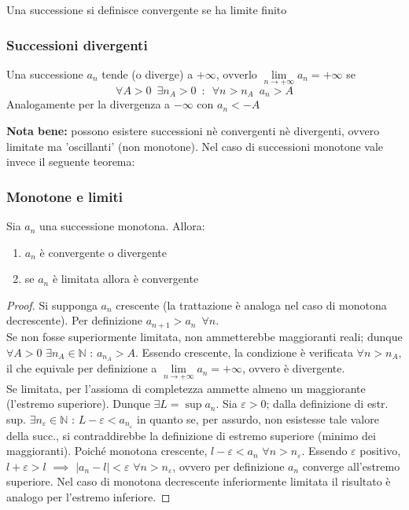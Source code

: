 \documentclass[10pt]{article}
\theoremstyle{plain}
\begin{document}
\begin{defin}
    Una successione si definisce convergente se ha limite finito
\end{defin}

\subsubsection{Successioni divergenti}
\begin{defin}
    Una successione $a_n$ tende (o diverge) a $+\infty$, ovverlo $\lim \limits_{n \rightarrow +\infty} a_n = + \infty$ se 
    \[\forall A > 0 \enspace \exists n_A > 0 \enspace : \enspace \forall n> n_A \enspace a_n > A\]
    Analogamente per la divergenza a $-\infty$ con $a_n < -A$
\end{defin}
\textbf{Nota bene: } possono esistere successioni nè convergenti nè divergenti, ovvero limitate ma 'oscillanti' (non monotone). Nel caso di successioni monotone vale invece il seguente teorema:

\subsubsection{Monotone e limiti}
\begin{ther}
    Sia $a_n$ una successione monotona. Allora:
    \begin{enumerate}
        \item $a_n$ è convergente o divergente
        \item se $a_n$ è limitata allora è convergente
    \end{enumerate}
\end{ther}
\begin{proof}
    Si supponga $a_n$ crescente (la trattazione è analoga nel caso di monotona decrescente). Per definizione $a_{n+1} > a_n \enspace \forall n$. 
    \\Se non fosse superiormente limitata, non ammetterebbe maggioranti reali; dunque $\forall A > 0$ $\exists n_A \in \mathbb{N}$ : $a_{n_A} > A$. Essendo crescente, la condizione è verificata $\forall n > n_A$, il che equivale per definizione a $\lim \limits_{n \rightarrow +\infty} a_n = +\infty$, ovvero è divergente.
    \\Se limitata, per l'assioma di completezza ammette almeno un maggiorante (l'estremo superiore). Dunque $\exists L = \sup a_n$. Sia $\varepsilon > 0$; dalla definizione di estr. sup. $\exists n_\varepsilon \in \mathbb{N}$ : $L - \varepsilon < a_{n_\varepsilon}$ in quanto se, per assurdo, non esistesse tale valore della succ., si contraddirebbe la definizione di estremo superiore (minimo dei maggioranti). Poiché monotona crescente, $l - \varepsilon < a_n$ $\forall n > n_\varepsilon$. Essendo $\varepsilon$ positivo, $l + \varepsilon > l$ $\implies$ $|a_n - l| < \varepsilon$ $\forall n > n_\varepsilon$, ovvero per definizione $a_n$ converge all'estremo superiore. Nel caso di monotona decrescente inferiormente limitata il risultato è analogo per l'estremo inferiore.
\end{proof}
\end{document}
